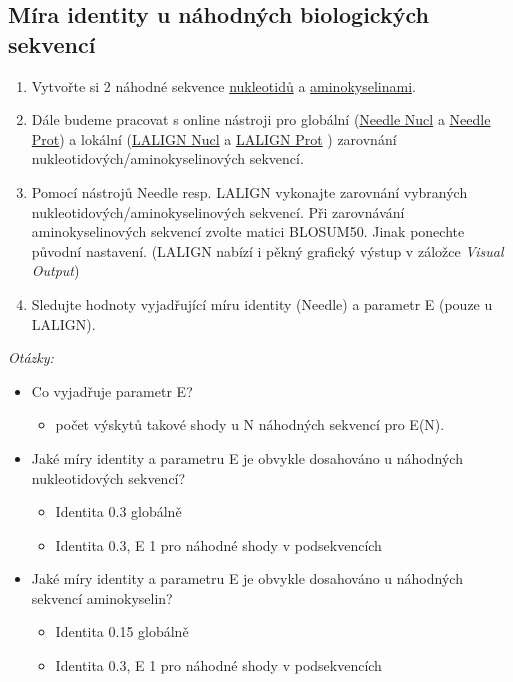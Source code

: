 \documentclass[11pt]{article}
\begin{document}
\subsection{Míra identity u náhodných biologických sekvencí}
\label{sec:org6549d52}
\begin{enumerate}
\item Vytvořte si 2 náhodné sekvence \href{http://www.bioinformatics.org/sms2/random\_dna.html}{nukleotidů} a \href{http://www.bioinformatics.org/sms2/random\_protein.html}{aminokyselinami}.
\item Dále budeme pracovat s online nástroji pro globální (\href{https://www.ebi.ac.uk/Tools/psa/emboss\_needle/nucleotide.html}{Needle Nucl} a \href{https://www.ebi.ac.uk/Tools/psa/emboss\_needle/}{Needle
Prot}) a lokální (\href{https://www.ebi.ac.uk/Tools/psa/lalign/nucleotide.html}{LALIGN Nucl} a \href{https://www.ebi.ac.uk/Tools/psa/lalign/}{LALIGN Prot} ) zarovnání
nukleotidových/aminokyselinových sekvencí.
\item Pomocí nástrojů Needle resp. LALIGN vykonajte zarovnání vybraných
nukleotidových/aminokyselinových sekvencí. Při zarovnávání aminokyselinových
sekvencí zvolte matici BLOSUM50. Jinak ponechte původní nastavení. (LALIGN
nabízí i pěkný grafický výstup v záložce \emph{Visual Output})
\item Sledujte hodnoty vyjadřující míru identity (Needle) a parametr E (pouze u
LALIGN).
\end{enumerate}

\emph{Otázky:}
\begin{itemize}
\item Co vyjadřuje parametr E?
\begin{itemize}
\item počet výskytů takové shody u N náhodných sekvencí pro E(N).
\end{itemize}
\item Jaké míry identity a parametru E je obvykle dosahováno u náhodných
nukleotidových sekvencí?
\begin{itemize}
\item Identita 0.3 globálně
\item Identita 0.3, E 1 pro náhodné shody v podsekvencích
\end{itemize}
\item Jaké míry identity a parametru E je obvykle dosahováno u náhodných
sekvencí aminokyselin?
\begin{itemize}
\item Identita 0.15 globálně
\item Identita 0.3, E 1 pro náhodné shody v podsekvencích
\end{itemize}
\end{itemize}
\end{document}
